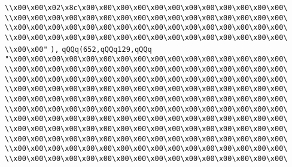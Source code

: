 \verb|\\x00\x00\x02\x8c\x00\x00\x00\x00\x00\x00\x00\x00\x00\x00\x00\x00\|\newline
\verb|\\x00\x00\x00\x00\x00\x00\x00\x00\x00\x00\x00\x00\x00\x00\x00\x00\|\newline
\verb|\\x00\x00\x00\x00\x00\x00\x00\x00\x00\x00\x00\x00\x00\x00\x00\x00\|\newline
\verb|\\x00\x00\x00\x00\x00\x00\x00\x00\x00\x00\x00\x00\x00\x00\x00\x00\|\newline
\verb|\\x00\x00"|\newline
\verb|),|\newline
\verb|qQQq(652,qQQq129,qQQq|\newline
\verb|"\x00\x00\x00\x00\x00\x00\x00\x00\x00\x00\x00\x00\x00\x00\x00\x00\|\newline
\verb|\\x00\x00\x00\x00\x00\x00\x00\x00\x00\x00\x00\x00\x00\x00\x00\x00\|\newline
\verb|\\x00\x00\x00\x00\x00\x00\x00\x00\x00\x00\x00\x00\x00\x00\x00\x00\|\newline
\verb|\\x00\x00\x00\x00\x00\x00\x00\x00\x00\x00\x00\x00\x00\x00\x00\x00\|\newline
\verb|\\x00\x00\x00\x00\x00\x00\x00\x00\x00\x00\x00\x00\x00\x00\x00\x00\|\newline
\verb|\\x00\x00\x00\x00\x00\x00\x00\x00\x00\x00\x00\x00\x00\x00\x00\x00\|\newline
\verb|\\x00\x00\x00\x00\x00\x00\x00\x00\x00\x00\x00\x00\x00\x00\x00\x00\|\newline
\verb|\\x00\x00\x00\x00\x00\x00\x00\x00\x00\x00\x00\x00\x00\x00\x00\x00\|\newline
\verb|\\x00\x00\x00\x00\x00\x00\x00\x00\x00\x00\x00\x00\x00\x00\x00\x00\|\newline
\verb|\\x00\x00\x00\x00\x00\x00\x00\x00\x00\x00\x00\x00\x00\x00\x00\x00\|\newline
\verb|\\x00\x00\x00\x00\x00\x00\x00\x00\x00\x00\x00\x00\x00\x00\x00\x00\|\newline
